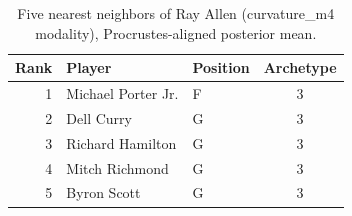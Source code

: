 \begin{table}[htbp]
  \centering\small
  \begin{tabular}{rllc}
    \toprule
    Rank & Player & Position & Archetype \\
    \midrule
    1 & Michael Porter Jr. & F & 3 \\
    2 & Dell Curry & G & 3 \\
    3 & Richard Hamilton & G & 3 \\
    4 & Mitch Richmond & G & 3 \\
    5 & Byron Scott & G & 3 \\
    \bottomrule
  \end{tabular}
  \caption{Five nearest neighbors of Ray Allen (curvature_m4 modality), Procrustes-aligned posterior mean.}
  \label{tab:Ray_Allen_neighbors_curvature_m4}
\end{table}

